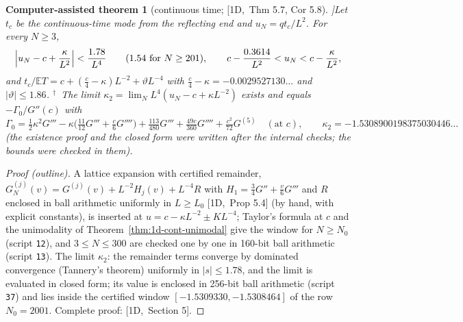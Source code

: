\documentclass[10pt,a4paper]{article}
\theoremstyle{plain}
\newtheorem{catheorem}[theorem]{Computer-assisted theorem}
\theoremstyle{definition}
\newcommand{\NEW}{\ensuremath{^{\dagger}}}       %
\newcommand{\src}[2]{[\textsf{#1},~#2]}           %
\newcommand{\ONE}{\textsf{1D}}
\newcommand{\E}{\mathbb{E}}
\begin{document}
\begin{catheorem}[continuous time; \src{\ONE}{Thm 5.7, Cor 5.8}]\label{thm:1d-cont}
Let $t_c$ be the continuous-time mode from the reflecting end and $u_N=qt_c/L^2$. For every $N\ge3$,
\[
\Bigl|u_N-c+\frac\kappa{L^2}\Bigr|<\frac{1.78}{L^4}\qquad(1.54\ \text{for}\ N\ge201),\qquad c-\frac{0.3614}{L^2}<u_N<c-\frac\kappa{L^2},
\]
and $t_c/\E T=c+(\frac c4-\kappa)L^{-2}+\vartheta L^{-4}$ with $\frac c4-\kappa=-0.0029527130\ldots$ and $|\vartheta|\le1.86$. \NEW\ The limit $\kappa_2=\lim_NL^4(u_N-c+\kappa L^{-2})$ exists and equals $-\Gamma_0/G''(c)$ with
\[
\Gamma_0=\tfrac12\kappa^2G'''-\kappa\bigl(\tfrac{11}{12}G'''+\tfrac c6G''''\bigr)+\tfrac{113}{480}G'''+\tfrac{49c}{360}G''''+\tfrac{c^2}{72}G^{(5)}\quad(\text{at }c),\qquad \kappa_2=-1.5308900198375030446\ldots
\]
(the existence proof and the closed form were written after the internal checks; the bounds were checked in them).
\end{catheorem}
\begin{proof}[Proof (outline)]
A lattice expansion with certified remainder, $G_N^{(j)}(v)=G^{(j)}(v)+L^{-2}H_j(v)+L^{-4}R$ with $H_1=\frac34G''+\frac v6G'''$ and $R$ enclosed in ball arithmetic uniformly in $L\ge L_0$ \src{\ONE}{Prop 5.4} (by hand, with explicit constants), is inserted at $u=c-\kappa L^{-2}\pm KL^{-4}$; Taylor's formula at $c$ and the unimodality of Theorem~\ref{thm:1d-cont-unimodal} give the window for $N\ge N_0$ (script \texttt{12}), and $3\le N\le300$ are checked one by one in 160-bit ball arithmetic (script \texttt{13}). The limit $\kappa_2$: the remainder terms converge by dominated convergence (Tannery's theorem) uniformly in $|s|\le1.78$, and the limit is evaluated in closed form; its value is enclosed in 256-bit ball arithmetic (script \texttt{37}) and lies inside the certified window $[-1.5309330,-1.5308464]$ of the row $N_0=2001$. Complete proof: \src{\ONE}{Section 5}.
\end{proof}
\end{document}
